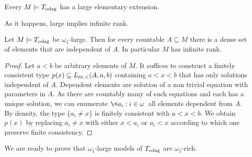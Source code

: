 





\begin{proposition}\label{prop_odag_large_exists}
  Every $M \models T_{\rm odag}$ has a large elementary extension. 
\end{proposition}

As it happens, large implies infinite rank.

\begin{proposition}\label{prop_odag_ind_dense}
  Let $M\models T_{\rm odag}$ be $\omega_1$-large.
  Then for every countable $A\subseteq M$ there is a dense set of elements that are independent of $A$.
  In particular $M$ has infinite rank.
\end{proposition}

\begin{proof}
  Let $a<b$ be arbitrary elements of $M$.
  It suffices to construct a finitely consistent type $p(x)\subseteq L_{\rm at, <}(A,a,b)$ containing $a<x<b$ that has only solutions independent of $A$.
  Dependent elements are solution of a non trivial equation with parameters in $A$.
  As there are countably many of such equations and each has a unique solution, we can enumerate $\<a_i:i\in\omega\>$ all elements dependent from $A$.
  By density, the type $\{a_i\neq x\}$ is finitely consistent with  $a<x<b$.
  We obtain $p(x)$ by replacing $a_i\neq x$ with either $x<a_i$ or $a_i<x$ according to which one preserve finite consistency.
\end{proof}

We are ready to prove that $\omega_1$-large models of $T_{\rm odag}$ are $\omega_1$-rich.

